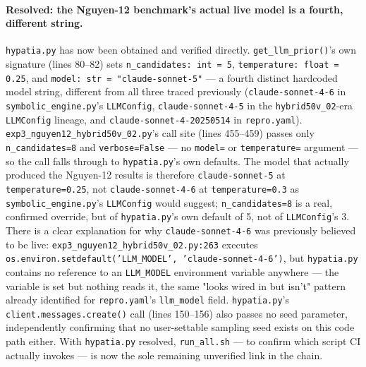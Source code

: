 \paragraph{Resolved: the Nguyen-12 benchmark's actual live model is a
fourth, different string.} \texttt{hypatia.py} has now been obtained and
verified directly. \texttt{get\_llm\_prior()}'s own signature (lines
80–82) sets \texttt{n\_candidates: int = 5}, \texttt{temperature: float =
0.25}, and \texttt{model: str = "claude-sonnet-5"} — a fourth distinct
hardcoded model string, different from all three traced previously
(\texttt{claude-sonnet-4-6} in \texttt{symbolic\_engine.py}'s
\texttt{LLMConfig}, \texttt{claude-sonnet-4-5} in the
\texttt{hybrid50v\_02}-era \texttt{LLMConfig} lineage, and
\texttt{claude-sonnet-4-20250514} in \texttt{repro.yaml}).
\texttt{exp3\_nguyen12\_hybrid50v\_02.py}'s call site (lines 455–459)
passes only \texttt{n\_candidates=8} and \texttt{verbose=False} — no
\texttt{model=} or \texttt{temperature=} argument — so the call falls
through to \texttt{hypatia.py}'s own defaults. The model that actually
produced the Nguyen-12 results is therefore \texttt{claude-sonnet-5} at
\texttt{temperature=0.25}, not \texttt{claude-sonnet-4-6} at
\texttt{temperature=0.3} as \texttt{symbolic\_engine.py}'s
\texttt{LLMConfig} would suggest; \texttt{n\_candidates=8} is a real,
confirmed override, but of \texttt{hypatia.py}'s own default of 5, not of
\texttt{LLMConfig}'s 3. There is a clear explanation for why
\texttt{claude-sonnet-4-6} was previously believed to be live:
\texttt{exp3\_nguyen12\_hybrid50v\_02.py:263} executes
\texttt{os.environ.setdefault('LLM\_MODEL', 'claude-sonnet-4-6')}, but
\texttt{hypatia.py} contains no reference to an \texttt{LLM\_MODEL}
environment variable anywhere — the variable is set but nothing reads
it, the same "looks wired in but isn't" pattern already identified for
\texttt{repro.yaml}'s \texttt{llm\_model} field. \texttt{hypatia.py}'s
\texttt{client.messages.create()} call (lines 150–156) also passes no
seed parameter, independently confirming that no user-settable sampling
seed exists on this code path either. With \texttt{hypatia.py} resolved,
\texttt{run\_all.sh} — to confirm which script CI actually invokes — is
now the sole remaining unverified link in the chain.

